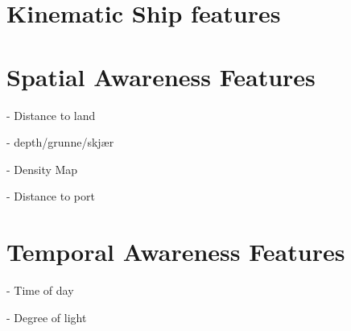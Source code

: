 \section{Kinematic Ship features}
\begin{info}{}
\end{info}




\section{Spatial Awareness Features}
\begin{info}{}
\end{info}

- Distance to land

- depth/grunne/skjær

- Density Map

- Distance to port

\section{Temporal Awareness Features}
\begin{info}{}
\end{info}

- Time of day

- Degree of light



